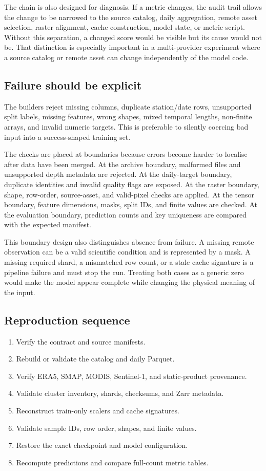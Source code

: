 \documentclass[12pt,a4paper]{report}
\begin{document}
The chain is also designed for diagnosis. If a metric changes, the audit trail
allows the change to be narrowed to the source catalog, daily aggregation,
remote asset selection, raster alignment, cache construction, model state, or
metric script. Without this separation, a changed score would be visible but
its cause would not be. That distinction is especially important in a
multi-provider experiment where a source catalog or remote asset can change
independently of the model code.

\subsection{Failure should be explicit}
The builders reject missing columns, duplicate station/date rows, unsupported
split labels, missing features, wrong shapes, mixed temporal lengths, non-finite
arrays, and invalid numeric targets. This is preferable to silently coercing
bad input into a success-shaped training set.

The checks are placed at boundaries because errors become harder to localise
after data have been merged. At the archive boundary, malformed files and
unsupported depth metadata are rejected. At the daily-target boundary, duplicate
identities and invalid quality flags are exposed. At the raster boundary,
shape, row-order, source-asset, and valid-pixel checks are applied. At the
tensor boundary, feature dimensions, masks, split IDs, and finite values are
checked. At the evaluation boundary, prediction counts and key uniqueness are
compared with the expected manifest.

This boundary design also distinguishes absence from failure. A missing remote
observation can be a valid scientific condition and is represented by a mask.
A missing required shard, a mismatched row count, or a stale cache signature is
a pipeline failure and must stop the run. Treating both cases as a generic zero
would make the model appear complete while changing the physical meaning of
the input.

\subsection{Reproduction sequence}
\begin{enumerate}
    \item Verify the contract and source manifests.
    \item Rebuild or validate the catalog and daily Parquet.
    \item Verify ERA5, SMAP, MODIS, Sentinel-1, and static-product provenance.
    \item Validate cluster inventory, shards, checksums, and Zarr metadata.
    \item Reconstruct train-only scalers and cache signatures.
    \item Validate sample IDs, row order, shapes, and finite values.
    \item Restore the exact checkpoint and model configuration.
    \item Recompute predictions and compare full-count metric tables.
\end{enumerate}
\end{document}
